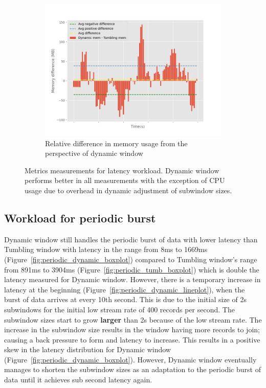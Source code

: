 \begin{figure}[htbp]
\begin{subfigure}[b]{\columnwidth}
        \includegraphics[width=0.5\columnwidth]{fig/constant-rate/mem_difference_bar.png}
        \caption{Relative difference in memory usage from the perspective of dynamic window}
        \label{fig:constant_mem_diff}
    \end{subfigure}

    \caption[Metrics measurements for latency workload.]
    {Metrics measurements for latency workload. Dynamic window performs 
    better in all measurements with the exception of CPU usage due to
overhead in dynamic adjustment of subwindow sizes.}%
    \label{fig:constant_measurement}
\end{figure}

\subsection{Workload for periodic burst}%
\label{sec:Results Workload for periodic burst}

Dynamic window still handles the periodic burst of data with lower latency 
than Tumbling window with latency in the range from 8ms to 1669ms
(Figure~\ref{fig:periodic_dynamic_boxplot}) compared to 
Tumbling window's range from 891ms to 3904ms 
(Figure~\ref{fig:periodic_tumb_boxplot}) which is double the latency 
measured for Dynamic window.
However, there is a temporary increase in latency at the beginning 
(Figure~\ref{fig:periodic_dynamic_lineplot}), 
when the burst of data arrives at every 10th second. 
This is due to the initial size of 2s subwindows for the initial low stream rate of 400 records per second. 
The subwindow sizes start to grow \textbf{larger} than 2s because of the low stream rate. 
The increase in the subwindow size results in the 
window having more records to join; causing a back pressure to form and latency to increase.  
This results in a positive skew in the latency distribution for Dynamic window (Figure~\ref{fig:periodic_dynamic_boxplot}). 
However, Dynamic window eventually manages to shorten the subwindow sizes as an
adaptation to the periodic burst of data until it achieves sub second latency again.



